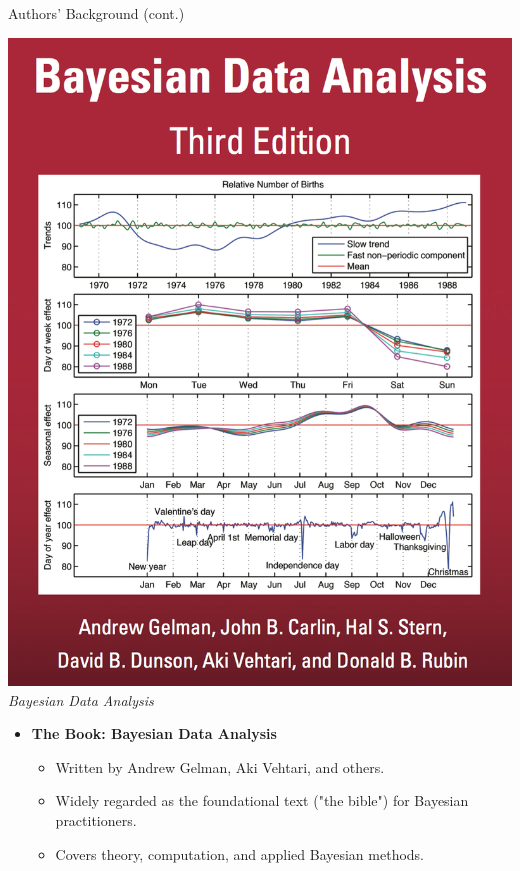 \documentclass{beamer}
\begin{document}
\begin{frame}{Authors' Background (cont.)}
\vspace{0.5em} 
\begin{minipage}{0.35\textwidth}
    \includegraphics[width=\textwidth]{bayesian_data_analysis_cover.png}
    \centering
    \small \textit{Bayesian Data Analysis}
\end{minipage}
\hfill
\begin{minipage}{0.6\textwidth}
    \small 
    \begin{itemize}
        \item \textbf{The Book: Bayesian Data Analysis}
        \begin{itemize}
            \item Written by Andrew Gelman, Aki Vehtari, and others.
            \item Widely regarded as the foundational text ("the bible") for Bayesian practitioners.
            \item Covers theory, computation, and applied Bayesian methods.

\end{itemize}
\end{itemize}
\end{minipage}
\end{frame}
\end{document}
